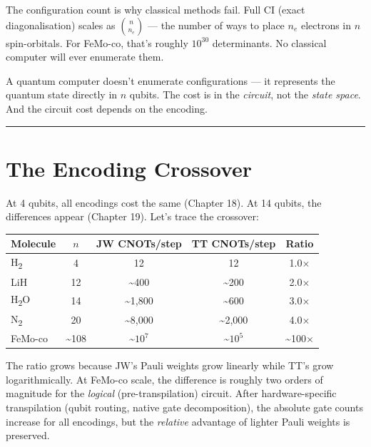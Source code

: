 \documentclass[
  11pt,
  oneside]{book}
\begin{document}
The configuration count is why classical methods fail. Full CI (exact
diagonalisation) scales as \(\binom{n}{n_e}\) --- the number of ways to
place \(n_e\) electrons in \(n\) spin-orbitals. For FeMo-co, that's
roughly \(10^{30}\) determinants. No classical computer will ever
enumerate them.

A quantum computer doesn't enumerate configurations --- it represents
the quantum state directly in \(n\) qubits. The cost is in the
\emph{circuit}, not the \emph{state space}. And the circuit cost depends
on the encoding.

\begin{center}\rule{0.5\linewidth}{0.5pt}\end{center}

\section{The Encoding Crossover}\label{the-encoding-crossover}

At 4 qubits, all encodings cost the same (Chapter 18). At 14 qubits, the
differences appear (Chapter 19). Let's trace the crossover:

\begin{longtable}[]{@{}lcccc@{}}
\toprule\noalign{}
Molecule & \(n\) & JW CNOTs/step & TT CNOTs/step & Ratio \\
\midrule\noalign{}
\endhead
\bottomrule\noalign{}
\endlastfoot
H\textsubscript{2} & 4 & 12 & 12 & 1.0$\times$ \\
LiH & 12 & \textasciitilde400 & \textasciitilde200 & 2.0$\times$ \\
H\textsubscript{2}O & 14 & \textasciitilde1,800 & \textasciitilde600 & 3.0$\times$ \\
N\textsubscript{2} & 20 & \textasciitilde8,000 & \textasciitilde2,000 & 4.0$\times$ \\
FeMo-co & \textasciitilde108 & \textasciitilde{}\(10^7\) &
\textasciitilde{}\(10^5\) & \textasciitilde100$\times$ \\
\end{longtable}

The ratio grows because JW's Pauli weights grow linearly while TT's grow
logarithmically. At FeMo-co scale, the difference is roughly two orders
of magnitude for the \emph{logical} (pre-transpilation) circuit. After
hardware-specific transpilation (qubit routing, native gate
decomposition), the absolute gate counts increase for all encodings, but
the \emph{relative} advantage of lighter Pauli weights is preserved.
\end{document}
